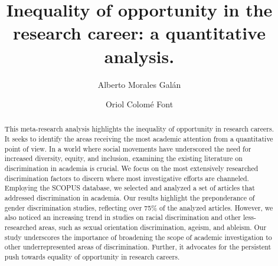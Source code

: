 \documentclass[runningheads]{llncs}
\begin{document}
\title{Inequality of opportunity in the research career: a quantitative analysis.}
\author{Alberto Morales Galán
\and
Oriol Colomé Font}
\maketitle              %
\begin{abstract}
This meta-research analysis highlights the inequality of opportunity in research careers. It seeks to identify the areas receiving the most academic attention from a quantitative point of view. In a world where social movements have underscored the need for increased diversity, equity, and inclusion, examining the existing literature on discrimination in academia is crucial. We focus on the most extensively researched discrimination factors to discern where most investigative efforts are channeled. Employing the SCOPUS database, we selected and analyzed a set of articles that addressed discrimination in academia. Our results highlight the preponderance of gender discrimination studies, reflecting over 75\% of the analyzed articles. However, we also noticed an increasing trend in studies on racial discrimination and other less-researched areas, such as sexual orientation discrimination, ageism, and ableism. Our study underscores the importance of broadening the scope of academic investigation to other underrepresented areas of discrimination. Further, it advocates for the persistent push towards equality of opportunity in research careers.

\end{abstract}

\end{document}

